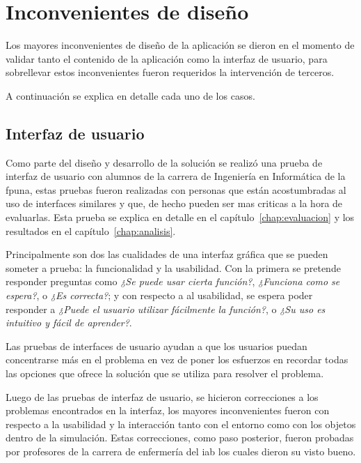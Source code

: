 \section{Inconvenientes de diseño}

Los mayores inconvenientes de diseño de la aplicación se dieron en el momento de
validar tanto el contenido de la aplicación como la interfaz de usuario, para
sobrellevar estos inconvenientes fueron requeridos la intervención de terceros.

A continuación se explica en detalle cada uno de los casos.

\subsection{Interfaz de usuario}

Como parte del diseño y desarrollo de la solución se realizó una prueba de
interfaz de usuario con alumnos de la carrera de Ingeniería en Informática de la
\Gls{fpuna}, estas pruebas fueron realizadas con personas que están
acostumbradas al uso de interfaces similares y que, de hecho pueden ser mas
criticas a la hora de evaluarlas. Esta prueba se explica en detalle en el
capítulo~\ref{chap:evaluacion} y los resultados en el
capítulo~\ref{chap:analisis}.

Principalmente son dos las cualidades de una interfaz gráfica que se pueden
someter a prueba: la funcionalidad y la usabilidad. Con la primera se pretende
responder preguntas como \textit{¿Se puede usar cierta función?},
\textit{¿Funciona como se espera?}, o \textit{¿Es correcta?}; y con respecto a
al usabilidad, se espera poder responder a \textit{¿Puede el usuario
    utilizar fácilmente la función?}, o \textit{¿Su uso es intuitivo y fácil de
    aprender?}\cite{fragaverificacion}.

Las pruebas de interfaces de usuario ayudan a que los usuarios puedan
concentrarse más en el problema en vez de poner los esfuerzos en recordar todas
las opciones que ofrece la solución que se utiliza para resolver el
problema\cite{horowitz1993graphical}.

Luego de las pruebas de interfaz de usuario, se hicieron correcciones a los
problemas encontrados en la interfaz, los mayores inconvenientes fueron con
respecto a la usabilidad y la interacción tanto con el entorno como con los
objetos dentro de la simulación. Estas correcciones, como paso posterior, fueron
probadas por profesores de la carrera de enfermería del \Gls{iab} los cuales
dieron su visto bueno.

